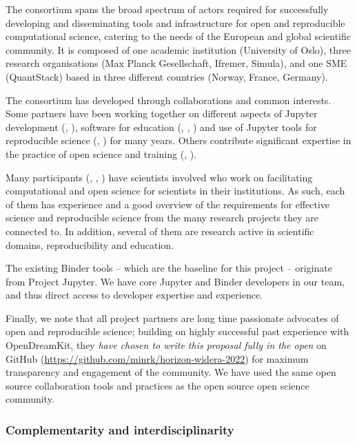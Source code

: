 The \TheProject consortium spans the broad spectrum of actors required for
successfully developing and disseminating tools and infrastructure for open and
reproducible computational science, catering to the needs of the European and
global scientific community. It is composed of one academic institution
(University of Oslo), three research organisations (Max Planck Gesellschaft, Ifremer,
Simula), and one SME (QuantStack) based in three different countries (Norway,
France, Germany).

The consortium has developed through collaborations and common interests. Some
partners have been working together on different aspects of Jupyter development
(, ), software for education (, ,
) and use of Jupyter tools for reproducible science (, )
for many years. Others contribute significant expertise in
the practice of open science and training (, ).

Many participants (, , ) have scientists involved who work on
facilitating computational and open science for scientists in their
institutions. As such, each of them has experience and a good overview of the
requirements for effective science and reproducible science from the many
research projects they are connected to. In addition, several of them are
research active in scientific domains, reproducibility and education.

The existing Binder tools -- which are the baseline for this project --
originate from Project Jupyter. We have core Jupyter and Binder developers in
our team, and thus direct access to developer expertise and experience.

Finally, we note that all project partners are long time passionate advocates of
open and reproducible science; building on highly successful past experience
with OpenDreamKit, they \emph{have chosen to write this proposal fully in the
  open} on GitHub
(\href{https://github.com/minrk/horizon-widera-2022}{https://github.com/minrk/horizon-widera-2022})
for maximum transparency and engagement of the community. We have used the same
open source collaboration tools and practices as the open source open science
community.

\subsubsection{Complementarity and interdisciplinarity}
\label{sec:complementarity-and-interdisciplinarity}

